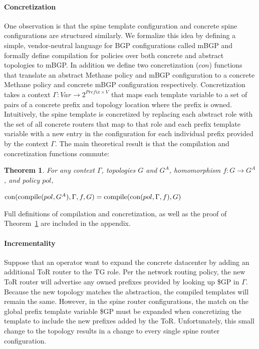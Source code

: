 \documentclass[numbers, 10pt, preprint]{sigplanconf}
\newcommand{\sysname}{{\small \sf Methane}\xspace}
\newcommand{\mbgp}{{\small \sf mBGP}\xspace}
\newcommand{\para}[1]{\paragraph*{\textbf{#1}}}
\newtheorem{thm}{Theorem}[section]
\begin{document}
\para{Concretization}

One observation is that the spine template configuration and concrete spine configurations are structured similarly. We formalize this idea by defining a simple, vendor-neutral language for BGP configurations called \mbgp and formally define compilation for policies over both concrete and abstract topologies to \mbgp. In addition we define two concretization ($con$) functions that translate an abstract \sysname policy and \mbgp configuration to a concrete \sysname policy and concrete \mbgp configuration respectively. Concretization takes a context $\Gamma : \mathit{Var} \rightarrow 2^{\mathit{Prefix} \times V}$ that maps each template variable to a set of pairs of a concrete prefix and topology location where the prefix is owned. Intuitively, the spine template is concretized by replacing each abstract role with the set of all concrete routers that map to that role and each prefix template variable with a new entry in the configuration for each individual prefix provided by the context $\Gamma$.
The main theoretical result is that the compilation and concretization functions commute:


\begin{thm}
  For any context $\Gamma$, topologies $G$ and $G^A$, homomorphism $f : G \rightarrow G^A$, and policy $pol$,

  \vspace{1em}
  \noindent
  $\text{con}(\text{compile}(pol,G^A), \Gamma,f,G) = \text{compile}(\text{con}(pol,\Gamma,f),G)$
  \label{thm:concretization}
\end{thm}
%
\vspace{-.8em}
Full definitions of compilation and concretization, as well as the proof of Theorem~\ref{thm:concretization} are included in the appendix.


\para{Incrementality}

Suppose that an operator want to expand the concrete datacenter by adding an additional ToR router to the TG role. Per the network routing policy, the new ToR router will advertise any owned prefixes provided by looking up {\small \$GP} in $\Gamma$. Because the new topology matches the abstraction, the compiled templates will remain the same. However, in the spine router configurations, the match on the global prefix template variable {\small \$GP} must be expanded when concretizing the template to include the new prefixes added by the ToR. Unfortunately, this small change to the topology results in a change to every single spine router configuration.
\end{document}
